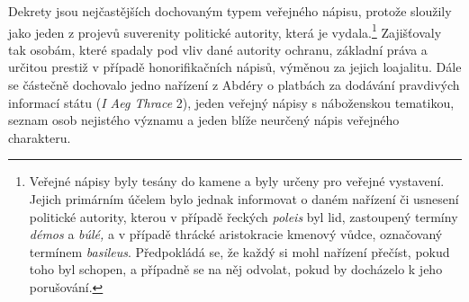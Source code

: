 Dekrety jsou nejčastějších dochovaným typem veřejného nápisu, protože sloužily jako jeden z projevů suverenity politické autority, která je vydala.\footnote{Veřejné nápisy byly tesány do kamene a byly určeny pro veřejné vystavení. Jejich primárním účelem bylo jednak informovat o daném nařízení či usnesení politické autority, kterou v případě řeckých {\em poleis} byl lid, zastoupený termíny {\em démos} a {\em búlé,} a v případě thrácké aristokracie kmenový vůdce, označovaný termínem {\em basileus}. Předpokládá se, že každý si mohl nařízení přečíst, pokud toho byl schopen, a případně se na něj odvolat, pokud by docházelo k jeho porušování.} Zajišťovaly tak osobám, které spadaly pod vliv dané autority ochranu, základní práva a určitou prestiž v případě honorifikačních nápisů, výměnou za jejich loajalitu. Dále se částečně dochovalo jedno nařízení z Abdéry o platbách za dodávání pravdivých informací státu ({\em I Aeg Thrace} 2), jeden veřejný nápisy s náboženskou tematikou, seznam osob nejistého významu a jeden blíže neurčený nápis veřejného charakteru.

